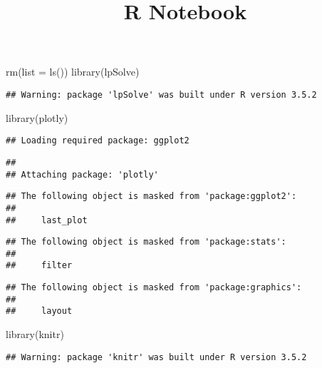 \documentclass[
]{article}
\title{R Notebook}
\author{}
\date{\vspace{-2.5em}}
\newenvironment{Shaded}{\begin{snugshade}}{\end{snugshade}}
\newcommand{\AttributeTok}[1]{\textcolor[rgb]{0.77,0.63,0.00}{#1}}
\newcommand{\FunctionTok}[1]{\textcolor[rgb]{0.00,0.00,0.00}{#1}}
\newcommand{\NormalTok}[1]{#1}
\newcommand{\StringTok}[1]{\textcolor[rgb]{0.31,0.60,0.02}{#1}}
\begin{document}
\maketitle

\begin{Shaded}
\begin{Highlighting}[]
\FunctionTok{rm}\NormalTok{(}\AttributeTok{list =} \FunctionTok{ls}\NormalTok{())}
\FunctionTok{library}\NormalTok{(lpSolve)}
\end{Highlighting}
\end{Shaded}

\begin{verbatim}
## Warning: package 'lpSolve' was built under R version 3.5.2
\end{verbatim}

\begin{Shaded}
\begin{Highlighting}[]
\FunctionTok{library}\NormalTok{(plotly)}
\end{Highlighting}
\end{Shaded}

\begin{verbatim}
## Loading required package: ggplot2
\end{verbatim}

\begin{verbatim}
## 
## Attaching package: 'plotly'
\end{verbatim}

\begin{verbatim}
## The following object is masked from 'package:ggplot2':
## 
##     last_plot
\end{verbatim}

\begin{verbatim}
## The following object is masked from 'package:stats':
## 
##     filter
\end{verbatim}

\begin{verbatim}
## The following object is masked from 'package:graphics':
## 
##     layout
\end{verbatim}

\begin{Shaded}
\begin{Highlighting}[]
\FunctionTok{library}\NormalTok{(}\StringTok{\textquotesingle{}knitr\textquotesingle{}}\NormalTok{)}
\end{Highlighting}
\end{Shaded}

\begin{verbatim}
## Warning: package 'knitr' was built under R version 3.5.2
\end{verbatim}
\end{document}
